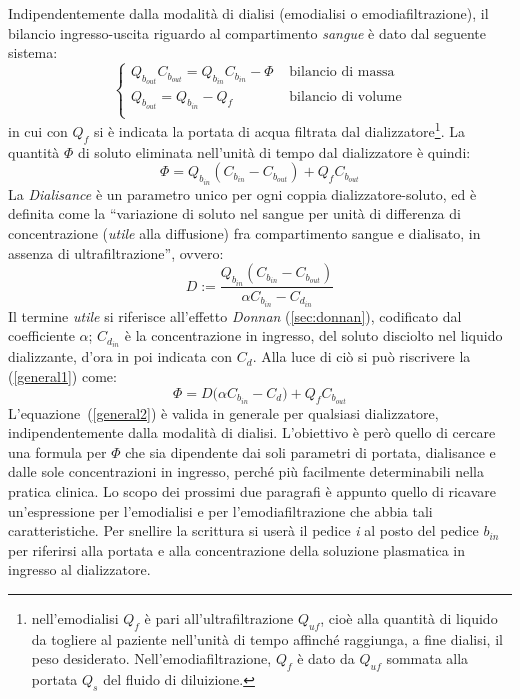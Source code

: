 Indipendentemente dalla modalità di dialisi (emodialisi o emodiafiltrazione), il bilancio ingresso-uscita riguardo al compartimento \textit{sangue} è dato dal seguente sistema:
\begin{equation}\label{bilancio}
	\begin{cases}
	Q_{b_{out}}C_{b_{out}} =Q_{b_{in}}C_{b_{in}}-\Phi & \text{  bilancio di massa}\\
	Q_{b_{out}} =Q_{b_{in}}-Q_f & \text{  bilancio di volume}\\
	\end{cases}
\end{equation}
in cui con $Q_f$ si è indicata la portata di acqua filtrata dal dializzatore\footnote{nell'emodialisi $Q_f$ è pari all'ultrafiltrazione $Q_{uf}$, cioè alla quantità di liquido da togliere al paziente nell'unità di tempo affinché raggiunga, a fine dialisi, il peso desiderato. Nell'emodiafiltrazione, $Q_f$ è dato da $Q_{uf}$ sommata alla portata $Q_s$ del fluido di diluizione.}.
La quantità $\Phi$ di soluto eliminata nell'unità di tempo dal dializzatore è quindi:
\begin{equation}\label{general1}
\Phi = Q_{b_{in}} (C_{b_{in}} - C_{b_{out}}) + Q_f C_{b_{out}}
\end{equation}
La \textit{Dialisance} è un parametro unico per ogni coppia dializzatore-soluto, ed è definita come la ``variazione di soluto nel sangue per unità di differenza di concentrazione (\textit{utile} alla diffusione) fra compartimento sangue e dialisato, in assenza di ultrafiltrazione'', ovvero:
\begin{equation*}
	D := \frac{Q_{b_{in}}(C_{b_{in}}-C_{b_{out}})}{\alpha C_{b_{in}} - C_{d_{in}}}
\end{equation*}
Il termine \textit{utile} si riferisce all'effetto \textit{Donnan} (\textsection\ref{sec:donnan}), codificato dal coefficiente $\alpha$; $C_{d_{in}}$ è la concentrazione in ingresso, del soluto disciolto nel liquido dializzante, d'ora in poi indicata con $C_d$. Alla luce di ciò si può riscrivere la (\ref{general1}) come:
\begin{equation}\label{general2}
	\Phi = D \biggl(\alpha C_{b_{in}} - C_d\biggr) + Q_f C_{b_{out}}
\end{equation}
L'equazione~(\ref{general2}) è valida in generale per qualsiasi dializzatore, indipendentemente dalla modalità di dialisi. L'obiettivo è però quello di cercare una formula per $\Phi$ che sia dipendente dai soli parametri di portata, dialisance e dalle sole concentrazioni in ingresso, perché più facilmente determinabili nella pratica clinica. Lo scopo dei prossimi due paragrafi è appunto quello di ricavare un'espressione per l'emodialisi e per l'emo\-dia\-fil\-tra\-zio\-ne che abbia tali caratteristiche. Per snellire la scrittura si userà il pedice \textit{i} al posto del pedice \textit{$b_{in}$} per riferirsi alla portata e alla concentrazione della soluzione plasmatica in ingresso al dializzatore.

